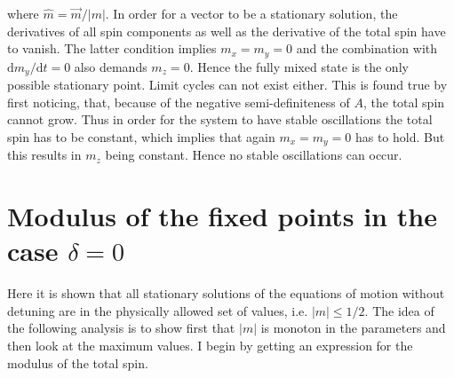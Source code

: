     where $\hat{m}=\vec{m}/|m|$. In order for a vector to be a stationary solution, the derivatives of all spin components as well as the derivative of the total spin have to vanish. The latter condition implies $m_x=m_y=0$ and the combination with $\text{d}m_y/\text{d}t=0$ also demands $m_z=0$. Hence the fully mixed state is the only possible stationary point. Limit cycles can not exist either. This is found true by first noticing, that, because of the negative semi-definiteness of $A$, the total spin cannot grow. Thus in order for the system to have stable oscillations the total spin has to be constant, which implies that again $m_x=m_y=0$ has to hold. But this results in $m_z$ being constant. Hence no stable oscillations can occur.
    \newpage




    \section{Modulus of the fixed points in the case $\delta=0$}
    \label{appendix:mod_of_fixp}
    Here it is shown that all stationary solutions of the equations of motion without detuning are in the physically allowed set of values, i.e. $|m|\leq1/2$.
    The idea of the following analysis is to show first that $|m|$ is monoton in the parameters and then look at the maximum values. I begin by getting an expression for the modulus of the total spin.
    
